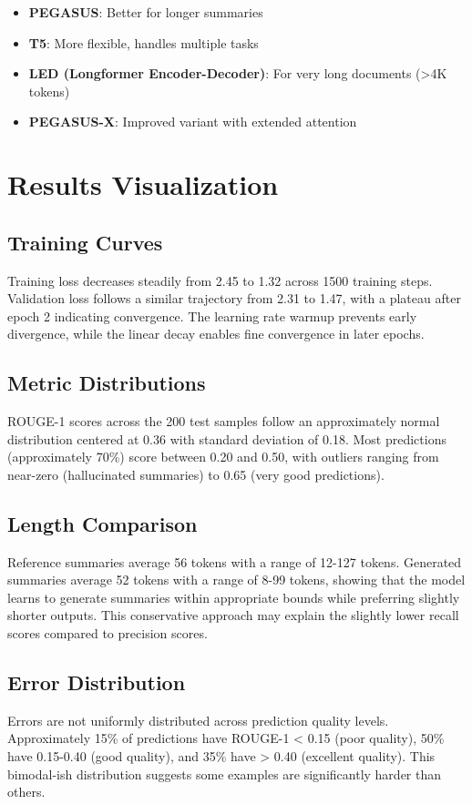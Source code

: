 \documentclass[12pt,a4paper,oneside]{report}
\begin{document}
\begin{itemize}
    \item \textbf{PEGASUS}: Better for longer summaries
    \item \textbf{T5}: More flexible, handles multiple tasks
    \item \textbf{LED (Longformer Encoder-Decoder)}: For very long documents (>4K tokens)
    \item \textbf{PEGASUS-X}: Improved variant with extended attention
\end{itemize}

\chapter{Results Visualization}
\label{app:visualization}

\section{Training Curves}
Training loss decreases steadily from 2.45 to 1.32 across 1500 training steps. Validation loss follows a similar trajectory from 2.31 to 1.47, with a plateau after epoch 2 indicating convergence. The learning rate warmup prevents early divergence, while the linear decay enables fine convergence in later epochs.

\section{Metric Distributions}
ROUGE-1 scores across the 200 test samples follow an approximately normal distribution centered at 0.36 with standard deviation of 0.18. Most predictions (approximately 70\%) score between 0.20 and 0.50, with outliers ranging from near-zero (hallucinated summaries) to 0.65 (very good predictions).

\section{Length Comparison}
Reference summaries average 56 tokens with a range of 12-127 tokens. Generated summaries average 52 tokens with a range of 8-99 tokens, showing that the model learns to generate summaries within appropriate bounds while preferring slightly shorter outputs. This conservative approach may explain the slightly lower recall scores compared to precision scores.

\section{Error Distribution}
Errors are not uniformly distributed across prediction quality levels. Approximately 15\% of predictions have ROUGE-1 < 0.15 (poor quality), 50\% have 0.15-0.40 (good quality), and 35\% have > 0.40 (excellent quality). This bimodal-ish distribution suggests some examples are significantly harder than others.
\end{document}
